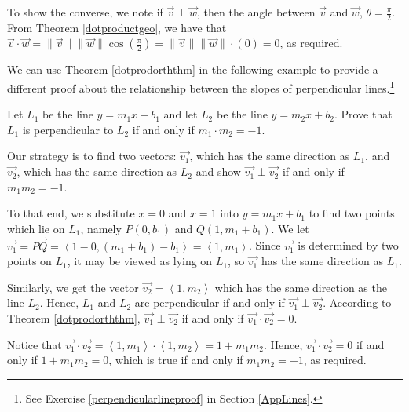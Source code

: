 \documentclass{ximera}
\begin{document}
 

 To show the converse, we note if $\overrightarrow{v} \perp \overrightarrow{w}$, then the angle between $\overrightarrow{v}$ and $\overrightarrow{w}$, $\theta = \frac{\pi}{2}$.  From Theorem \ref{dotproductgeo}, we have that $\overrightarrow{v} \cdot \overrightarrow{w} = \| \overrightarrow{v} \| \| \overrightarrow{w} \| \cos \left( \frac{\pi}{2} \right) = \| \overrightarrow{v} \| \| \overrightarrow{w} \| \cdot (0) = 0$, as required.

 

We can use Theorem \ref{dotprodorththm} in the following example to provide a different proof about the relationship between the slopes of perpendicular lines.\footnote{See Exercise \ref{perpendicularlineproof} in Section \ref{AppLines}.}

\begin{example}\label{perpendicularlines2} Let $L_1$ be the line $y = m_1x + b_1$ and let $L_2$ be the line $y = m_2x + b_2$.  Prove that $L_1$ is perpendicular to $L_2$ if and only if $m_1 \cdot m_2 = -1$.

\begin{explanation}
Our strategy is to find two vectors: $\overrightarrow{v_1}$, which has the same direction as $L_1$,  and $\overrightarrow{v_2}$, which has the same direction as $L_2$ and show $\overrightarrow{v_1} \perp \overrightarrow{v_2}$ if and only if $ m_1  m_2 = -1$. 

 

 To that end, we substitute $x=0$ and $x=1$ into $y = m_1x + b_1$  to find two points which lie on $L_1$, namely $P(0,  b_1)$ and $Q(1, m_1 + b_1)$.  
 We let $\overrightarrow{v_1} = \overrightarrow{PQ} = \left<1-0,(m_1+b_1) - b_1\right>=\left<1,m_1\right>$.  Since  $\overrightarrow{v_1}$ is determined by two points on $L_1$, it may be viewed as lying on $L_1$, so $\overrightarrow{v_1}$  has the same direction as $L_1$. 
 
  
 
 Similarly, we get the vector  $\overrightarrow{v_2} = \left<1,m_2\right>$ which has the same direction as the line 
$L_2$.  Hence, $L_1$ and $L_2$ are perpendicular if and only if $\overrightarrow{v_1} \perp \overrightarrow{v_2}$. According to Theorem \ref{dotprodorththm}, $\overrightarrow{v_1} \perp \overrightarrow{v_2}$ if and only if $\overrightarrow{v_1} \cdot \overrightarrow{v_2} = 0$.  

 

Notice that $\overrightarrow{v_1} \cdot \overrightarrow{v_2} = \left<1,m_1\right> \cdot \left<1,m_2\right> = 1 + m_1m_2$.  Hence,  $\overrightarrow{v_1} \cdot \overrightarrow{v_2} = 0$ if and only if $1 + m_1m_2  =0$, which is true if and only if $ m_1  m_2 = -1$, as required. 

\end{explanation}
\end{example}
\end{document}
